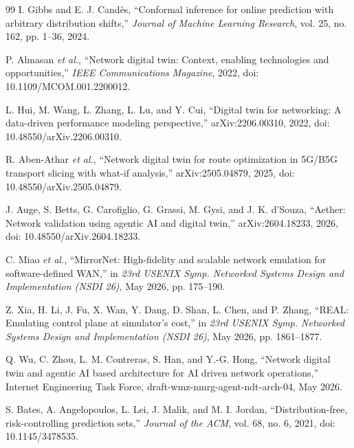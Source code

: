 \begin{thebibliography}{99}
I. Gibbs and E. J. Cand\`es, ``Conformal inference for online prediction with arbitrary distribution shifts,'' \emph{Journal of Machine Learning Research}, vol. 25, no. 162, pp. 1--36, 2024.

P. Almasan \emph{et al.}, ``Network digital twin: Context, enabling technologies and opportunities,'' \emph{IEEE Communications Magazine}, 2022, doi: 10.1109/MCOM.001.2200012.

L. Hui, M. Wang, L. Zhang, L. Lu, and Y. Cui, ``Digital twin for networking: A data-driven performance modeling perspective,'' arXiv:2206.00310, 2022, doi: 10.48550/arXiv.2206.00310.

R. Aben-Athar \emph{et al.}, ``Network digital twin for route optimization in 5G/B5G transport slicing with what-if analysis,'' arXiv:2505.04879, 2025, doi: 10.48550/arXiv.2505.04879.

J. Auge, S. Betts, G. Carofiglio, G. Grassi, M. Gysi, and J. K. d'Souza, ``Aether: Network validation using agentic AI and digital twin,'' arXiv:2604.18233, 2026, doi: 10.48550/arXiv.2604.18233.

C. Miao \emph{et al.}, ``MirrorNet: High-fidelity and scalable network emulation for software-defined WAN,'' in \emph{23rd USENIX Symp. Networked Systems Design and Implementation (NSDI 26)}, May 2026, pp. 175--190.

Z. Xia, H. Li, J. Fu, X. Wan, Y. Dang, D. Shan, L. Chen, and P. Zhang, ``REAL: Emulating control plane at simulator's cost,'' in \emph{23rd USENIX Symp. Networked Systems Design and Implementation (NSDI 26)}, May 2026, pp. 1861--1877.

Q. Wu, C. Zhou, L. M. Contreras, S. Han, and Y.-G. Hong, ``Network digital twin and agentic AI based architecture for AI driven network operations,'' Internet Engineering Task Force, draft-wmz-nmrg-agent-ndt-arch-04, May 2026.

S. Bates, A. Angelopoulos, L. Lei, J. Malik, and M. I. Jordan, ``Distribution-free, risk-controlling prediction sets,'' \emph{Journal of the ACM}, vol. 68, no. 6, 2021, doi: 10.1145/3478535.

\end{thebibliography}
